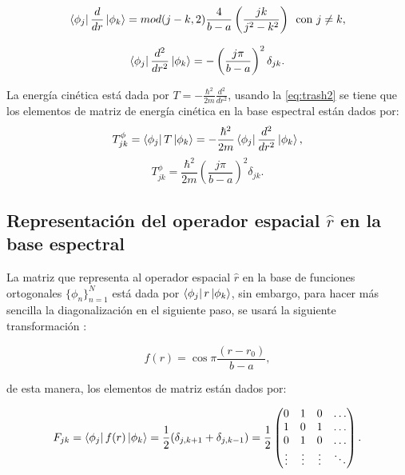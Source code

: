 \begin{equation}
  \label{eq:trash1}
  \bra{\phi_j}\frac{d}{d r}\ket{\phi_k} = mod(j-k,2)\frac{4}{b-a}\left(\frac{jk}{j^2 - k^2}\right)\,\,\,\text{con } j\neq k,
\end{equation}

\begin{equation}
  \label{eq:trash2}
  \bra{\phi_j}\frac{d^2}{d r^2}\ket{\phi_k} = -\left( \frac{j\pi}{b-a} \right)^2 \delta_{jk}.
\end{equation}

La energía cinética está dada por $T= -\frac{\hbar^2}{2m}\frac{d^2}{d r^2}$, usando la \autoref{eq:trash2} se tiene que los elementos de matriz de energía cinética en la base espectral están dados por:
\begin{equation}
  \label{eq:T_phi0}
  T^{\phi}_{jk} = \bra{\phi_j}T\ket{\phi_k} = -\frac{\hbar^2}{2m}\bra{\phi_j}\frac{d^2}{d r^2}\ket{\phi_k},
\end{equation}
\begin{equation}
  \label{eq:T_phi}
  T^{\phi}_{jk} = \frac{\hbar^2}{2m} \left( \frac{j\pi}{b-a} \right)^2 \delta_{jk}.
\end{equation}

\subsection{Representación del operador espacial $\hat{r}$ en la base espectral}

La matriz que representa al operador espacial $\hat{r}$ en la base de funciones ortogonales $\{\phi_n \}_{n=1}^{N}$ está dada por $\bra{\phi_j}r\ket{\phi_k}$, sin embargo, para hacer más sencilla la diagonalización en el siguiente paso, se usará la siguiente transformación \cite{Hans}:

\begin{equation}
  \label{eq:trash3}
  f(r) = \cos{\pi\frac{(r-r_0)}{b-a}},
\end{equation}

\noindent de esta manera, los elementos de matriz están dados por:

\begin{equation}
  \label{eq:trash4}
  F_{jk} = \bra{\phi_j}f(r)\ket{\phi_k} = \frac{1}{2}(\delta_{j,k+1}+ \delta_{j,k-1}) = \frac{1}{2}
  \begin{pmatrix}
0 & 1 & 0 & \ldots\\
1 & 0 & 1 & \ldots \\
0 & 1 & 0 & \ldots \\
\vdots & \vdots & \vdots & \ddots
\end{pmatrix}.
\end{equation}

